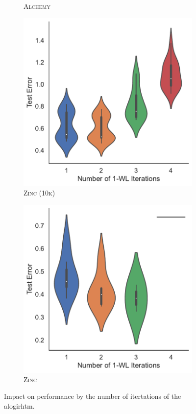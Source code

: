 \begin{figure}[!htb]
\begin{subfigure}[b]{0.19\textwidth}
        \caption{\scriptsize\textsc{Alchemy}}
	\end{subfigure}
	\hfill
	\begin{subfigure}[b]{0.19\textwidth}
		\centering
		\includegraphics[width=\textwidth]{Figures/k_wl_violin_Zinc 10k.pdf}
        \caption{\scriptsize\textsc{Zinc (10k)}}
	\end{subfigure}
	\hfill
	\begin{subfigure}[b]{0.19\textwidth}
		\centering
		\includegraphics[width=\textwidth]{Figures/k_wl_violin_Zinc.pdf}
        \caption{\scriptsize\textsc{Zinc}}
	\end{subfigure}
	\caption{Impact on performance by the number of itertations of the \wl alogirhtm.}
	\label{fig:k_wl_dependence}
\end{figure}

